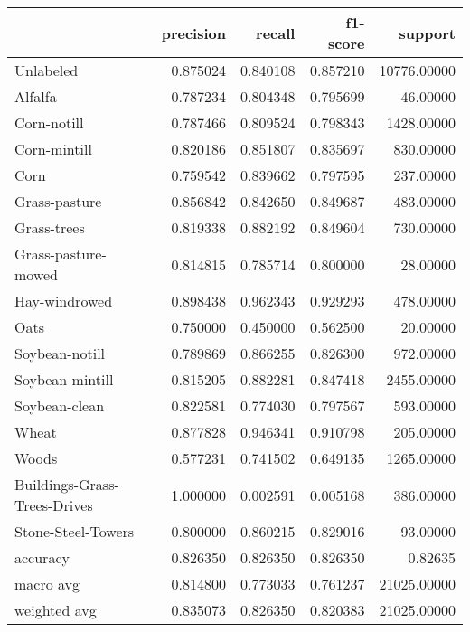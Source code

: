 \begin{tabular}{lrrrr}
\toprule
{} &  precision &    recall &  f1-score &      support \\
\midrule
Unlabeled                    &   0.875024 &  0.840108 &  0.857210 &  10776.00000 \\
Alfalfa                      &   0.787234 &  0.804348 &  0.795699 &     46.00000 \\
Corn-notill                  &   0.787466 &  0.809524 &  0.798343 &   1428.00000 \\
Corn-mintill                 &   0.820186 &  0.851807 &  0.835697 &    830.00000 \\
Corn                         &   0.759542 &  0.839662 &  0.797595 &    237.00000 \\
Grass-pasture                &   0.856842 &  0.842650 &  0.849687 &    483.00000 \\
Grass-trees                  &   0.819338 &  0.882192 &  0.849604 &    730.00000 \\
Grass-pasture-mowed          &   0.814815 &  0.785714 &  0.800000 &     28.00000 \\
Hay-windrowed                &   0.898438 &  0.962343 &  0.929293 &    478.00000 \\
Oats                         &   0.750000 &  0.450000 &  0.562500 &     20.00000 \\
Soybean-notill               &   0.789869 &  0.866255 &  0.826300 &    972.00000 \\
Soybean-mintill              &   0.815205 &  0.882281 &  0.847418 &   2455.00000 \\
Soybean-clean                &   0.822581 &  0.774030 &  0.797567 &    593.00000 \\
Wheat                        &   0.877828 &  0.946341 &  0.910798 &    205.00000 \\
Woods                        &   0.577231 &  0.741502 &  0.649135 &   1265.00000 \\
Buildings-Grass-Trees-Drives &   1.000000 &  0.002591 &  0.005168 &    386.00000 \\
Stone-Steel-Towers           &   0.800000 &  0.860215 &  0.829016 &     93.00000 \\
accuracy                     &   0.826350 &  0.826350 &  0.826350 &      0.82635 \\
macro avg                    &   0.814800 &  0.773033 &  0.761237 &  21025.00000 \\
weighted avg                 &   0.835073 &  0.826350 &  0.820383 &  21025.00000 \\
\bottomrule
\end{tabular}
